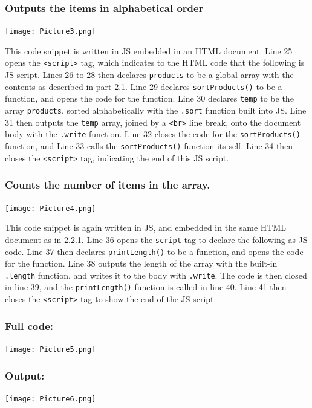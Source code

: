 \documentclass[a4paper]{article}
\begin{document}
\subsubsection{Outputs the items in alphabetical order}
\noindent\texttt{[image: Picture3.png]} \par
This code snippet is written in JS embedded in an HTML document. Line 25 opens the \verb|<script>| tag, which indicates to the HTML code that the following is JS script. Lines 26 to 28 then declares \verb|products| to be a global array with the contents as described in part 2.1. Line 29 declares \verb|sortProducts()| to be a function, and opens the code for the function. Line 30 declares \verb|temp| to be the array \verb|products|, sorted alphabetically with the \verb|.sort| function built into JS. Line 31 then outputs the \verb|temp| array, joined by a \verb|<br>| line break, onto the document body with the \verb|.write| function. Line 32 closes the code for the \verb|sortProducts()| function, and Line 33 calls the \verb|sortProducts()| function its self. Line 34 then closes the \verb|<script>| tag, indicating the end of this JS script. \newpage
\subsubsection{Counts the number of items in the array.}
\noindent\texttt{[image: Picture4.png]} \par
This code snippet is again written in JS, and embedded in the same HTML document as in 2.2.1. Line 36 opens the \verb|script| tag to declare the following as JS code. Line 37 then declares \verb|printLength()| to be a function, and opens the code for the function. Line 38 outputs the length of the array with the built-in \verb|.length| function, and writes it to the body with \verb|.write|.  The code is then closed in line 39, and the \verb|printLength()| function is called in line 40. Line 41 then closes the \verb|<script>| tag to show the end of the JS script.
\subsubsection{Full code:}
\noindent\texttt{[image: Picture5.png]} \par \newpage
\subsubsection{Output:}
\noindent\texttt{[image: Picture6.png]} \par \newpage
\end{document}
